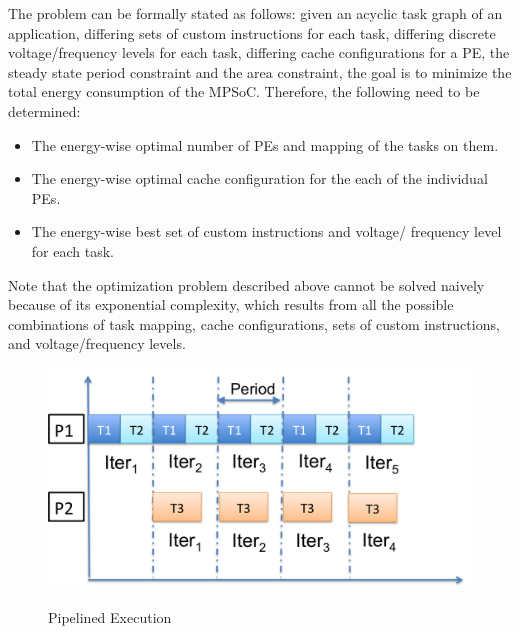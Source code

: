 The problem can be formally stated as follows: given an acyclic task
graph of an application, differing sets of custom
instructions for each task, differing discrete voltage/frequency levels
for each task, differing cache configurations for a PE, the steady state
period constraint and the area constraint, the goal is to minimize the
total energy consumption of the MPSoC. Therefore, the following need to
be determined:
\begin{itemize}
\item The energy-wise optimal number of PEs and mapping of the tasks on them.
\item The energy-wise optimal cache configuration for the each of the
individual PEs.
\item The energy-wise best set of custom instructions and voltage/
frequency level for each task.
\end{itemize}

Note that the optimization problem described above cannot be solved
naively because of its exponential complexity, which results from all
the possible combinations of task mapping, cache configurations, sets of
custom instructions, and voltage/frequency levels.


\begin{figure}[h]
\center
\includegraphics[scale=0.40]{pipeline.png}
\label{fig:pipeline}
\caption {Pipelined Execution}
\end{figure}
